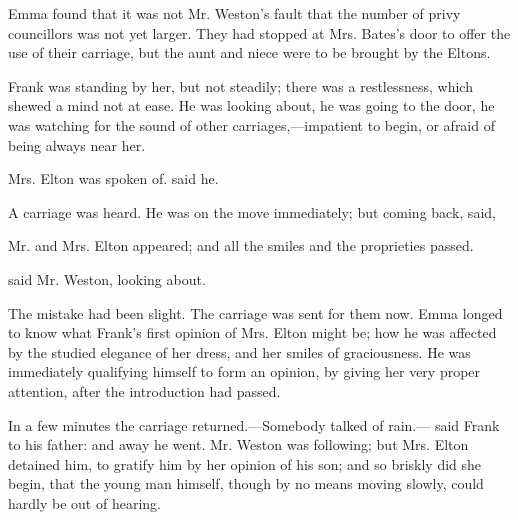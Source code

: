 Emma found that it was not Mr. Weston's fault that the number of privy councillors was not yet larger. They had stopped at Mrs. Bates's door to offer the use of their carriage, but the aunt and niece were to be brought by the Eltons.

Frank was standing by her, but not steadily; there was a restlessness, which shewed a mind not at ease. He was looking about, he was going to the door, he was watching for the sound of other carriages,---impatient to begin, or afraid of being always near her.

Mrs. Elton was spoken of.  said he. 

A carriage was heard. He was on the move immediately; but coming back, said,


Mr. and Mrs. Elton appeared; and all the smiles and the proprieties passed.

 said Mr. Weston, looking about. 

The mistake had been slight. The carriage was sent for them now. Emma longed to know what Frank's first opinion of Mrs. Elton might be; how he was affected by the studied elegance of her dress, and her smiles of graciousness. He was immediately qualifying himself to form an opinion, by giving her very proper attention, after the introduction had passed.

In a few minutes the carriage returned.---Somebody talked of rain.--- said Frank to his father:  and away he went. Mr. Weston was following; but Mrs. Elton detained him, to gratify him by her opinion of his son; and so briskly did she begin, that the young man himself, though by no means moving slowly, could hardly be out of hearing.


